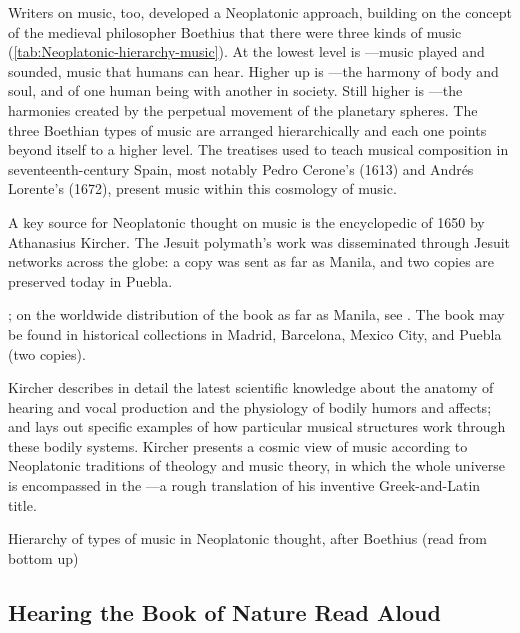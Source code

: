 Writers on music, too, developed a Neoplatonic approach, building on the
concept of the medieval philosopher Boethius that there were three kinds of
music (\cref{tab:Neoplatonic-hierarchy-music}).%
    \Autocite{Boethius:Musica}
At the lowest level is ---music played and sounded,
music that humans can hear.
Higher up is ---the harmony of body and soul, and of one
human being with another in society.
Still higher is ---the harmonies created by the perpetual
movement of the planetary spheres.
The three Boethian types of music are arranged hierarchically and each one
points beyond itself to a higher level.
The treatises used to teach musical composition in seventeenth-century Spain,
most notably Pedro Cerone's  (1613) and Andrés
Lorente's  (1672), present music within this
cosmology of music.

A key source for Neoplatonic thought on music is the encyclopedic
 of 1650 by Athanasius Kircher.%
    \Autocite{Kircher:Musurgia}
The Jesuit polymath's work was disseminated through Jesuit networks across the
globe: a copy was sent as far as Manila, and two copies are preserved today in
Puebla.%
\begin{Footnote}
    \Autocites
    {Findlen:Kircher}
    {Godwin:KircherTheater};
    on the worldwide distribution of the book as far as Manila, see
    \autocite[48--50]{Irving:Colonial}.  
    The book may be found in historical collections in Madrid, Barcelona, Mexico
    City, and Puebla (two copies). %
\end{Footnote}
Kircher describes in detail the latest scientific knowledge about the anatomy
of hearing and vocal production and the physiology of bodily humors and
affects; and lays out specific examples of how particular musical structures
work through these bodily systems.
Kircher presents a cosmic view of music according to Neoplatonic traditions of
theology and music theory, in which the whole universe is encompassed in the
---a rough translation of his inventive
Greek-and-Latin title.%
    \Autocites
    {Findlen:Kircher}
    {Godwin:KircherTheater}

{Hierarchy of types of music in Neoplatonic thought, after Boethius (read from
bottom up)}

\subsection{Hearing the Book of Nature Read Aloud}

